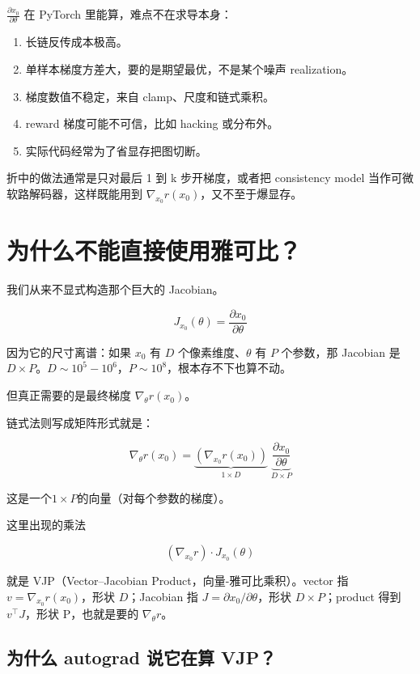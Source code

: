 \(\frac{\partial x_0}{\partial\theta} \) 在 PyTorch 里能算，难点不在求导本身：

\begin{enumerate}
  \item 长链反传成本极高。
  \item 单样本梯度方差大，要的是期望最优，不是某个噪声 realization。
  \item 梯度数值不稳定，来自 clamp、尺度和链式乘积。
  \item reward 梯度可能不可信，比如 hacking 或分布外。
  \item 实际代码经常为了省显存把图切断。
\end{enumerate}

折中的做法通常是只对最后 1 到 k 步开梯度，或者把 consistency model 当作可微软路解码器，这样既能用到 \(\nabla_{x_0} r(x_0)\)，又不至于爆显存。

\section{为什么不能直接使用雅可比？}

我们从来不显式构造那个巨大的 Jacobian。

\[
J_{x_0}(\theta)=\frac{\partial x_0}{\partial \theta}
\]

因为它的尺寸离谱：如果 \(x_0\) 有 \(D\) 个像素维度、\(\theta\) 有 \(P\) 个参数，那 Jacobian 是 \(D\times P\)。\(D\sim 10^5\!-\!10^6\)，\(P\sim 10^8\)，根本存不下也算不动。

但真正需要的是最终梯度 \(\nabla_\theta r(x_0)\)。

链式法则写成矩阵形式就是：

\[
\nabla_\theta r(x_0)=\underbrace{\left(\nabla_{x_0} r(x_0)\right)}_{1\times D}\;\underbrace{\frac{\partial x_0}{\partial \theta}}_{D\times P}
\]

这是一个\( 1\times P \)的向量（对每个参数的梯度）。

这里出现的乘法

\[
(\nabla_{x_0} r)\cdot J_{x_0}(\theta)
\]

就是 VJP（Vector–Jacobian Product，向量-雅可比乘积）。vector 指 \(v=\nabla_{x_0} r(x_0)\)，形状 \(D\)；Jacobian 指 \(J=\partial x_0/\partial\theta\)，形状 \(D\times P\)；product 得到 \(v^\top J\)，形状 P，也就是要的 \(\nabla_\theta r\)。

\subsection{为什么 autograd 说它在算 VJP？}

